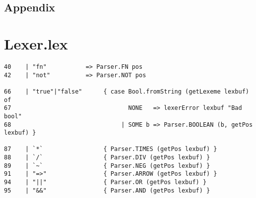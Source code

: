 \documentclass[paper=a4, fontsize=11pt]{scrartcl} %
\numberwithin{equation}{section} %
\numberwithin{figure}{section} %
\numberwithin{table}{section} %
\begin{document}
\section*{Appendix}

\appendix

\chapter{Lexer.lex}

\begin{lstlisting}
40	  | "fn"           => Parser.FN pos 
42	  | "not"          => Parser.NOT pos

66	  | "true"|"false"      { case Bool.fromString (getLexeme lexbuf) of 
67	                               NONE   => lexerError lexbuf "Bad bool" 
68	                             | SOME b => Parser.BOOLEAN (b, getPos lexbuf) }

87	  | `*`                 { Parser.TIMES (getPos lexbuf) } 
88	  | `/`                 { Parser.DIV (getPos lexbuf) } 
89	  | `~`                 { Parser.NEG (getPos lexbuf) }
91	  | "=>"                { Parser.ARROW (getPos lexbuf) } 
94	  | "||"                { Parser.OR (getPos lexbuf) } 
95	  | "&&"                { Parser.AND (getPos lexbuf) } 
\end{lstlisting}

\pagebreak
\end{document}
